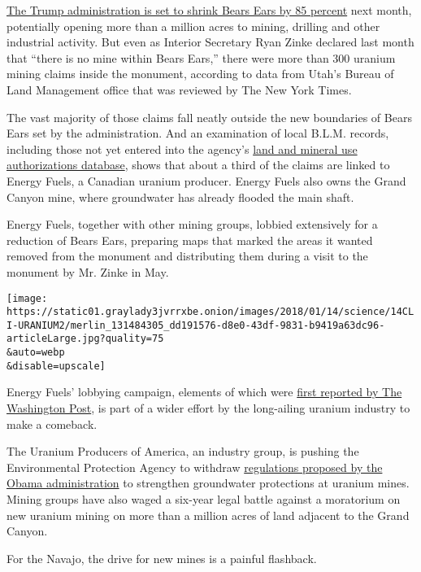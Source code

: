 \href{https://www.nytimes3xbfgragh.onion/2017/12/04/us/trump-bears-ears.html}{The
Trump administration is set to shrink Bears Ears by 85 percent} next
month, potentially opening more than a million acres to mining, drilling
and other industrial activity. But even as Interior Secretary Ryan Zinke
declared last month that ``there is no mine within Bears Ears,'' there
were more than 300 uranium mining claims inside the monument, according
to data from Utah's Bureau of Land Management office that was reviewed
by The New York Times.

The vast majority of those claims fall neatly outside the new boundaries
of Bears Ears set by the administration. And an examination of local
B.L.M. records, including those not yet entered into the agency's
\href{https://reports.blm.gov/content/lr2000/about/}{land and mineral
use authorizations database}, shows that about a third of the claims are
linked to Energy Fuels, a Canadian uranium producer. Energy Fuels also
owns the Grand Canyon mine, where groundwater has already flooded the
main shaft.

Energy Fuels, together with other mining groups, lobbied extensively for
a reduction of Bears Ears, preparing maps that marked the areas it
wanted removed from the monument and distributing them during a visit to
the monument by Mr. Zinke in May.

\texttt{[image: https://static01.graylady3jvrrxbe.onion/images/2018/01/14/science/14CLI-URANIUM2/merlin\_131484305\_dd191576-d8e0-43df-9831-b9419a63dc96-articleLarge.jpg?quality=75\\\&auto=webp\\\&disable=upscale]}

Energy Fuels' lobbying campaign, elements of which were
\href{https://www.washingtonpost.com/national/health-science/uranium-firm-urged-trump-officials-to-shrink-bears-ears-national-monument/2017/12/08/2eea39b6-dc31-11e7-b1a8-62589434a581_story.html}{first
reported by The Washington Post}, is part of a wider effort by the
long-ailing uranium industry to make a comeback.

The Uranium Producers of America, an industry group, is pushing the
Environmental Protection Agency to withdraw
\href{https://www.epa.gov/radiation/40-cfr-part-192-proposed-rulemaking-and-background-documents}{regulations
proposed by the Obama administration} to strengthen groundwater
protections at uranium mines. Mining groups have also waged a six-year
legal battle against a moratorium on new uranium mining on more than a
million acres of land adjacent to the Grand Canyon.

For the Navajo, the drive for new mines is a painful flashback.

